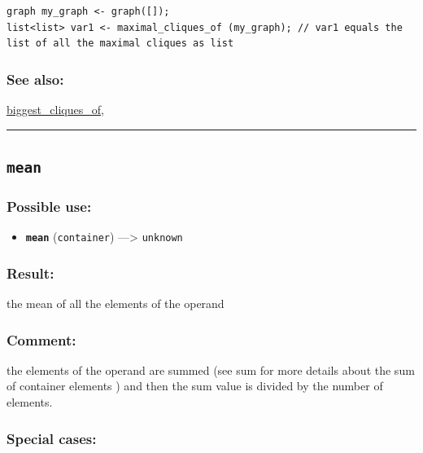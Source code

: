 \documentclass[]{book}
\providecommand{\tightlist}{%
  \setlength{\itemsep}{0pt}\setlength{\parskip}{0pt}}
\theoremstyle{definition}
\theoremstyle{definition}
\theoremstyle{definition}
\theoremstyle{remark}
\begin{document}
\begin{verbatim}
graph my_graph <- graph([]);  
list<list> var1 <- maximal_cliques_of (my_graph); // var1 equals the list of all the maximal cliques as list
\end{verbatim}

\subsubsection{See also:}\label{see-also-136}

\href{operators-b-to-c.html\#biggest_cliques_of}{biggest\_cliques\_of},

\begin{center}\rule{0.5\linewidth}{\linethickness}\end{center}

\subsection{\texorpdfstring{\texttt{mean}}{mean}}\label{mean}

\subsubsection{Possible use:}\label{possible-use-343}

\begin{itemize}
\tightlist
\item
  \textbf{\texttt{mean}} (\texttt{container}) ---\textgreater{}
  \texttt{unknown}
\end{itemize}

\subsubsection{Result:}\label{result-332}

the mean of all the elements of the operand

\subsubsection{Comment:}\label{comment-67}

the elements of the operand are summed (see sum for more details about
the sum of container elements ) and then the sum value is divided by the
number of elements.

\subsubsection{Special cases:}\label{special-cases-95}
\end{document}
